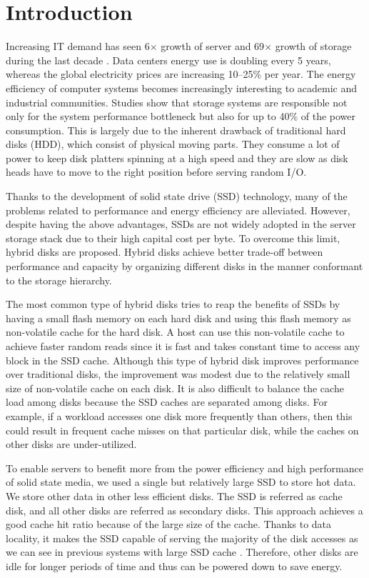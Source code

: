 \section{Introduction}
\label{intro}


Increasing IT demand has seen 6$\times$ growth of server and
69$\times$ growth of storage during the last decade
\cite{ibm_green_beyond}. Data centers energy use is doubling every 5
years, whereas the global electricity prices are increasing 10--25\%
per year. The energy efficiency of computer systems becomes
increasingly interesting to academic and industrial communities.
Studies show that storage systems are responsible not only for the
system performance bottleneck but also for up to 40\% of the power
consumption\cite{storage_40}. This is largely due to the inherent
drawback of traditional hard disks (HDD), which consist of physical
moving parts. They consume a lot of power to keep disk platters
spinning at a high speed and they are slow as disk heads have to move
to the right position before serving random I/O.

Thanks to the development of solid state drive (SSD) technology, many
of the problems related to performance and energy efficiency are
alleviated. However, despite having the above advantages, SSDs are
not widely adopted in the server storage stack due to their high
capital cost per byte. To overcome this limit, hybrid disks are
proposed. Hybrid disks achieve better trade-off between performance
and capacity by organizing different disks in the manner conformant to
the storage hierarchy. 

The most common type of hybrid disks \cite{Bisson07ahybrid} tries to
reap the benefits of SSDs by having a small flash memory on each hard
disk and using this flash memory as \mbox{non-volatile} cache for the
hard disk. A host can use this \mbox{non-volatile} cache to achieve
faster random reads since it is fast and takes constant time to access
any block in the SSD cache. Although this type of hybrid disk improves
performance over traditional disks, the improvement was modest due to
the relatively small size of \mbox{non-volatile} cache on each disk.
It is also difficult to balance the cache load among disks because the
SSD caches are separated among disks. For example, if a workload
accesses one disk more frequently than others, then this could result
in frequent cache misses on that particular disk, while the caches on
other disks are under-utilized. 

To enable servers to benefit more from the power efficiency and high
performance of solid state media, we used a single but relatively
large SSD to store hot data. We store other data in other less
efficient disks. The SSD is referred as cache disk, and all other
disks are referred as secondary disks. This approach achieves a good
cache hit ratio because of the large size of the cache. Thanks to data
locality, it makes the SSD capable of serving the majority of the disk
accesses as we can see in previous systems with large SSD cache
\cite{Debnath_SkimpyStash, Debnath_Bloomflash,
flashcache_experiments}. Therefore, other disks are idle for longer
periods of time and thus can be powered down to save energy. 

